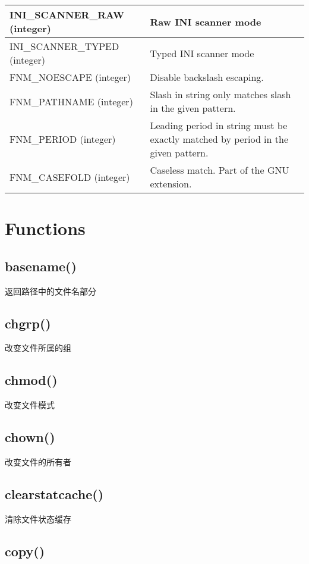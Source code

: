 \begin{longtable}{|m{100pt}|m{300pt}|}
\hline
INI\_SCANNER\_RAW (integer)&Raw INI scanner mode\\
\hline
INI\_SCANNER\_TYPED (integer)&Typed INI scanner mode\\
\hline
FNM\_NOESCAPE (integer)&Disable backslash escaping.\\
\hline
FNM\_PATHNAME (integer)&Slash in string only matches slash in the given pattern.\\
\hline
FNM\_PERIOD (integer)&Leading period in string must be exactly matched by period in the given pattern.\\
\hline
FNM\_CASEFOLD (integer)&Caseless match. Part of the GNU extension.\\
\hline
\end{longtable}



\chapter{Functions}

\section{basename()}

返回路径中的文件名部分

\section{chgrp()}

改变文件所属的组

\section{chmod()}

改变文件模式

\section{chown()}

改变文件的所有者

\section{clearstatcache()}

清除文件状态缓存

\section{copy()}

